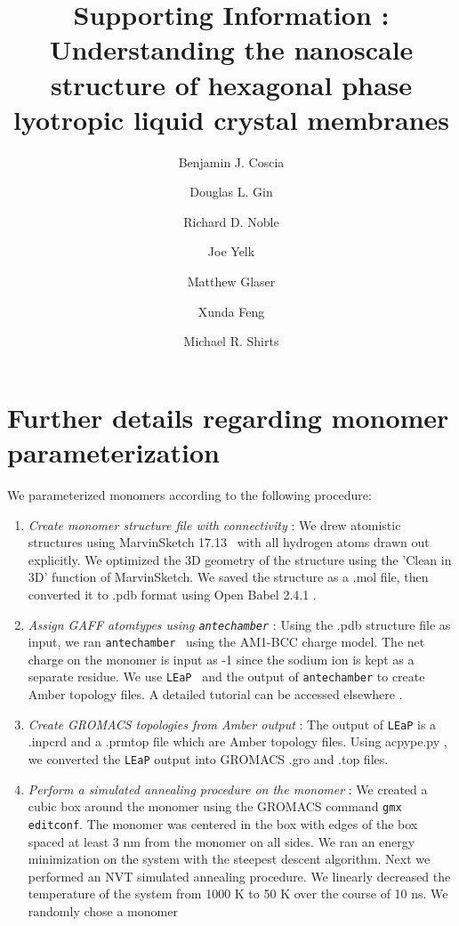 \documentclass{article}
\title{Supporting Information : Understanding the nanoscale structure of hexagonal phase lyotropic liquid crystal membranes}
\author{Benjamin J. Coscia \and Douglas L. Gin \and Richard D. Noble \and Joe Yelk \and Matthew Glaser \and Xunda Feng \and Michael R. Shirts}
\begin{document}
  
  \graphicspath{{./figures/}}  %
  \maketitle

  \section{Further details regarding monomer parameterization}\label{section:parameterization}
 
  We parameterized monomers according to the following procedure:
  \begin{enumerate}
	\item \textit{Create monomer structure file with connectivity} : We
	drew atomistic structures using MarvinSketch
	17.13~\cite{chemaxon_marvinsketch_2017} with all hydrogen atoms drawn out
	explicitly. We optimized the 3D geometry of the structure using the 'Clean in
	3D' function of MarvinSketch.  We saved the structure as a .mol file, then
	converted it to .pdb format using Open Babel 2.4.1
	\cite{oboyle_open_2011,noauthor_open_nodate}. 
	\item \textit{Assign GAFF atomtypes using \texttt{antechamber}} : Using
	the .pdb structure file as input, we ran
	\texttt{antechamber}~\cite{wang_automatic_2006} using the AM1-BCC charge model.
	The net charge on the monomer is input as -1 since the sodium ion is kept as 
	a separate residue. We use \texttt{LEaP}~\cite{case_ambertools16_2016} and the
	output of \texttt{antechamber} to create Amber topology files. A detailed
	tutorial can be accessed elsewhere \cite{walker_antechamber_nodate}.
	\item \textit{Create GROMACS topologies from Amber output} : The output
	of \texttt{LEaP} is a .inpcrd and a .prmtop file which are Amber topology
	files. Using acpype.py \cite{sousa_da_silva_acpype_2012}, we converted the
	\texttt{LEaP} output into GROMACS .gro and .top files. 
	\item \textit{Perform a simulated annealing procedure on the monomer} :
	We created a cubic box around the monomer using the GROMACS command \texttt{gmx
	editconf}. The monomer was centered in the box with edges of the
	box spaced at least 3 nm from the monomer on all sides. We ran an energy minimization
	on the system with the steepest descent algorithm. Next we performed an NVT
	simulated annealing procedure. We linearly decreased the temperature of the
	system from 1000 K to 50 K over the course of 10 ns. We randomly chose a monomer

\end{enumerate}
\end{document}
